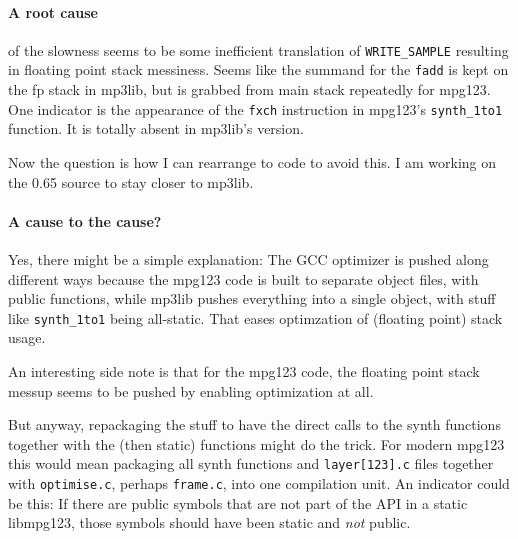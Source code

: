 \documentclass[a4paper,12pt]{scrartcl}
\begin{document}
\paragraph{A root cause}
of the slowness seems to be some inefficient translation of \verb:WRITE_SAMPLE: resulting in floating point stack messiness.
Seems like the summand for the \verb:fadd: is kept on the fp stack in mp3lib, but is grabbed from main stack repeatedly for mpg123. One indicator is the appearance of the \verb:fxch: instruction in mpg123's \verb:synth_1to1: function.
It is totally absent in mp3lib's version.

Now the question is how I can rearrange to code to avoid this. I am working on the 0.65 source to stay closer to mp3lib.

\paragraph{A cause to the cause?}
Yes, there might be a simple explanation: The GCC optimizer is pushed along different ways because the mpg123 code is built to separate object files, with public functions, while mp3lib pushes everything into a single object, with stuff like \verb:synth_1to1: being all-static.
That eases optimzation of (floating point) stack usage.

An interesting side note is that for the mpg123 code, the floating point stack messup seems to be pushed by enabling optimization at all.

But anyway, repackaging the stuff to have the direct calls to the synth functions together with the (then static) functions might do the trick.
For modern mpg123 this would mean packaging all synth functions and \verb:layer[123].c: files together with \verb:optimise.c:, perhaps \verb:frame.c:, into one compilation unit.
An indicator could be this: If there are public symbols that are not part of the API in a static libmpg123, those symbols should have been static and {\em not} public.
\end{document}
